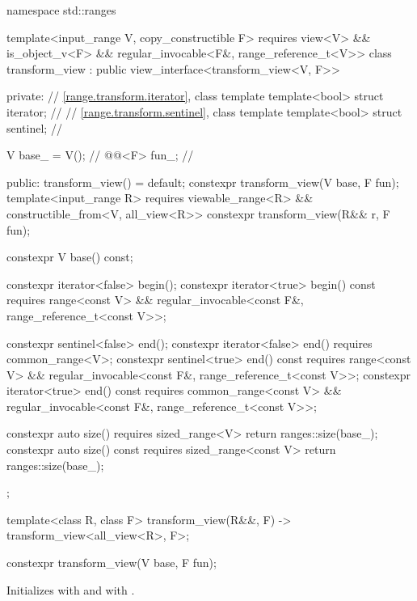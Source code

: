 %
\begin{codeblock}
namespace std::ranges {
  template<input_range V, copy_constructible F>
    requires view<V> && is_object_v<F> &&
             regular_invocable<F&, range_reference_t<V>>
  class transform_view : public view_interface<transform_view<V, F>> {
  private:
    // \ref{range.transform.iterator}, class template 
    template<bool> struct iterator;             // \expos
    // \ref{range.transform.sentinel}, class template 
    template<bool> struct sentinel;             // \expos

    V base_ = V();                              // \expos
    @@<F> fun_;                    // \expos

  public:
    transform_view() = default;
    constexpr transform_view(V base, F fun);
    template<input_range R>
      requires viewable_range<R> && constructible_from<V, all_view<R>>
    constexpr transform_view(R&& r, F fun);

    constexpr V base() const;

    constexpr iterator<false> begin();
    constexpr iterator<true> begin() const
      requires range<const V> &&
               regular_invocable<const F&, range_reference_t<const V>>;

    constexpr sentinel<false> end();
    constexpr iterator<false> end() requires common_range<V>;
    constexpr sentinel<true> end() const
      requires range<const V> &&
               regular_invocable<const F&, range_reference_t<const V>>;
    constexpr iterator<true> end() const
      requires common_range<const V> &&
               regular_invocable<const F&, range_reference_t<const V>>;

    constexpr auto size() requires sized_range<V> { return ranges::size(base_); }
    constexpr auto size() const requires sized_range<const V>
    { return ranges::size(base_); }
  };

  template<class R, class F>
    transform_view(R&&, F) -> transform_view<all_view<R>, F>;
}
\end{codeblock}

%
\begin{itemdecl}
constexpr transform_view(V base, F fun);
\end{itemdecl}

\begin{itemdescr}
\pnum
\effects
Initializes  with  and
 with .
\end{itemdescr}

